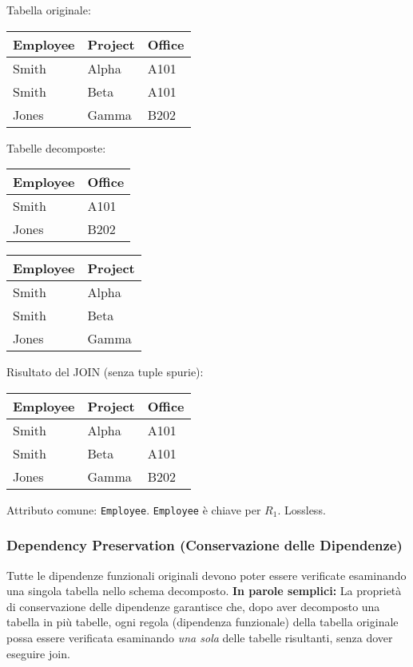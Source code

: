 \documentclass{article}
\begin{document}
	\noindent Tabella originale:
	\begin{center}
	\begin{tabular}{|l|l|l|}
		\hline
		\textbf{Employee} & \textbf{Project} & \textbf{Office} \\ \hline
		Smith & Alpha & A101 \\ \hline
		Smith & Beta & A101 \\ \hline
		Jones & Gamma & B202 \\ \hline
	\end{tabular}
	\end{center}

	\noindent Tabelle decomposte:
	\begin{center}
	\begin{tabular}{|l|l|}
		\hline
		\textbf{Employee} & \textbf{Office} \\ \hline
		Smith & A101 \\ \hline
		Jones & B202 \\ \hline
	\end{tabular}
	\quad
	\begin{tabular}{|l|l|}
		\hline
		\textbf{Employee} & \textbf{Project} \\ \hline
		Smith & Alpha \\ \hline
		Smith & Beta \\ \hline
		Jones & Gamma \\ \hline
	\end{tabular}
	\end{center}

	\noindent Risultato del JOIN (senza tuple spurie):
	\begin{center}
	\begin{tabular}{|l|l|l|}
		\hline
		\textbf{Employee} & \textbf{Project} & \textbf{Office} \\ \hline
		Smith & Alpha & A101 \\ \hline
		Smith & Beta & A101 \\ \hline
		Jones & Gamma & B202 \\ \hline
	\end{tabular}
	\end{center}
	
	\noindent Attributo comune: \texttt{Employee}. \texttt{Employee} è chiave per $R_1$. Lossless.
	
	\subsubsection{Dependency Preservation (Conservazione delle Dipendenze)}
	Tutte le dipendenze funzionali originali devono poter essere verificate esaminando una singola tabella nello schema decomposto.
	\newline
	\newline
	\textbf{In parole semplici:} La proprietà di conservazione delle dipendenze garantisce che, dopo aver decomposto una tabella in più tabelle, ogni regola (dipendenza funzionale) della tabella originale possa essere verificata esaminando \textit{una sola} delle tabelle risultanti, senza dover eseguire join.
	
\end{document}
